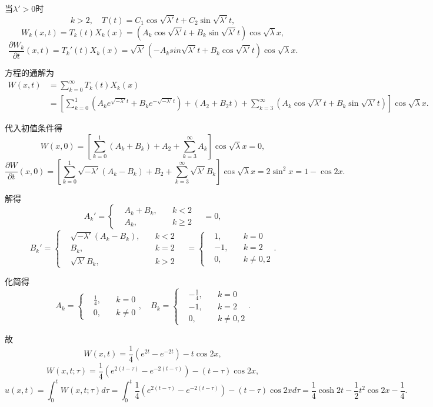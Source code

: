 \documentclass[11pt,a4paper]{article}
\begin{document}
当$\lambda'>0$时
$$k>2,\quad T(t)=C_1\cos\sqrt{\lambda'}t+C_2\sin\sqrt{\lambda'}t,$$
$$W_k(x,t)=T_k(t)X_k(x)=(A_k\cos\sqrt{\lambda'}t+B_k\sin\sqrt{\lambda'}t)\cos\sqrt{\lambda}x,$$
$$\frac{\partial W_k}{\partial t}(x,t)=T_k'(t)X_k(x)=\sqrt{\lambda'}(-A_ksin\sqrt{\lambda'}t+B_k\cos\sqrt{\lambda'}t)\cos\sqrt{\lambda}x.$$

方程的通解为
\begin{align*}
  W(x,t)
   & =\sum_{k=0}^\infty T_k(t)X_k(x)              \\
   & =\left[\sum_{k=0}^1(A_ke^{\sqrt{-\lambda'}t}
  +B_ke^{-\sqrt{-\lambda'}t})+(A_2+B_2t)
  +\sum_{k=3}^\infty(A_k\cos\sqrt{\lambda'}t
  +B_k\sin\sqrt{\lambda'}t)\right]\cos\sqrt{\lambda}x.
\end{align*}

代入初值条件得
$$W(x,0)=\left[\sum_{k=0}^1(A_k+B_k)+A_2+\sum_{k=3}^\infty A_k\right]\cos\sqrt{\lambda}x=0,$$
$$\frac{\partial W}{\partial t}(x,0)=\left[\sum_{k=0}^1\sqrt{-\lambda'}(A_k-B_k)+B_2+\sum_{k=3}^\infty\sqrt{\lambda'}B_k\right]\cos\sqrt{\lambda}x=2\sin^2x=1-\cos2x.$$

解得
$$A_k'=\left\{\begin{aligned}&A_k+B_k,&\quad k<2\\&A_k,&\quad k\geqslant 2\end{aligned}\right.\quad=0,$$
$$B_k'=\left\{\begin{aligned}&\sqrt{-\lambda'}(A_k-B_k),&\quad k<2\\&B_k,&\quad k=2\\&\sqrt{\lambda'}B_k,&\quad k>2\end{aligned}\right.\quad=\left\{\begin{aligned}&1,&\quad k=0\\&-1,&\quad k=2\\&0,&\quad k\neq 0,2\end{aligned}\right..$$

化简得
$$A_k=\left\{\begin{aligned}&\frac{1}{4},&\quad k=0\\&0,&\quad k\neq 0\end{aligned}\right.,\quad
  B_k=\left\{\begin{aligned}&-\frac{1}{4},&\quad k=0\\&-1,&\quad k=2\\&0,&\quad k\neq0,2\end{aligned}\right..$$

故
$$W(x,t)=\frac{1}{4}(e^{2t}-e^{-2t})-t\cos2x,$$
$$W(x,t;\tau)=\frac{1}{4}(e^{2(t-\tau)}-e^{-2(t-\tau)})-(t-\tau)\cos2x,$$
$$u(x,t)=\int_0^tW(x,t;\tau)d\tau =\int_0^t\frac{1}{4}(e^{2(t-\tau)}-e^{-2(t-\tau)})-(t-\tau)\cos2xd\tau =\frac{1}{4}\cosh 2t-\frac{1}{2}t^2\cos 2x-\frac{1}{4}.$$
\end{document}
